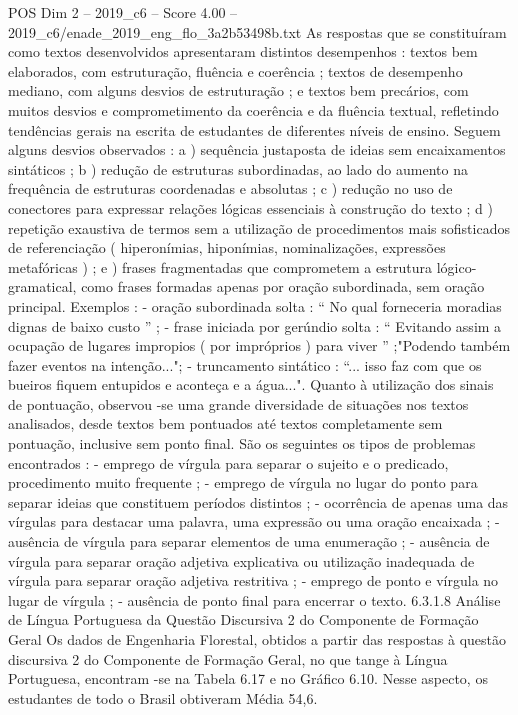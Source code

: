 \begin{textsample}{POS Dim 2 – 2019\_c6 – Score 4.00 – 2019\_c6/enade\_2019\_eng\_flo\_3a2b53498b.txt}
As respostas que se constituíram como textos desenvolvidos apresentaram distintos desempenhos : textos bem elaborados, com estruturação, fluência e coerência ; textos de desempenho mediano, com alguns desvios de estruturação ; e textos bem precários, com muitos desvios e comprometimento da coerência e da fluência textual, refletindo tendências gerais na escrita de estudantes de diferentes níveis de ensino.
Seguem alguns desvios observados : a ) sequência justaposta de ideias sem encaixamentos sintáticos ; b ) redução de estruturas subordinadas, ao lado do aumento na frequência de estruturas coordenadas e absolutas ; c ) redução no uso de conectores para expressar relações lógicas essenciais à construção do texto ; d ) repetição exaustiva de termos sem a utilização de procedimentos mais sofisticados de referenciação ( hiperonímias, hiponímias, nominalizações, expressões metafóricas ) ; e ) frases fragmentadas que comprometem a estrutura lógico-gramatical, como frases formadas apenas por oração subordinada, sem oração principal.
Exemplos : - oração subordinada solta : “ No qual forneceria moradias dignas de baixo custo ” ; - frase iniciada por gerúndio solta : “ Evitando assim a ocupação de lugares impropios ( por impróprios ) para viver ” ;"Podendo também fazer eventos na intenção..."; - truncamento sintático : “... isso faz com que os bueiros fiquem entupidos e aconteça e a água...".
Quanto à utilização dos sinais de pontuação, observou -se uma grande diversidade de situações nos textos analisados, desde textos bem pontuados até textos completamente sem pontuação, inclusive sem ponto final.
São os seguintes os tipos de problemas encontrados : - emprego de vírgula para separar o sujeito e o predicado, procedimento muito frequente ; - emprego de vírgula no lugar do ponto para separar ideias que constituem períodos distintos ; - ocorrência de apenas uma das vírgulas para destacar uma palavra, uma expressão ou uma oração encaixada ; - ausência de vírgula para separar elementos de uma enumeração ; - ausência de vírgula para separar oração adjetiva explicativa ou utilização inadequada de vírgula para separar oração adjetiva restritiva ; - emprego de ponto e vírgula no lugar de vírgula ; - ausência de ponto final para encerrar o texto. 6.3.1.8 Análise de Língua Portuguesa da Questão Discursiva 2 do Componente de Formação Geral Os dados de Engenharia Florestal, obtidos a partir das respostas à questão discursiva 2 do Componente de Formação Geral, no que tange à Língua Portuguesa, encontram -se na Tabela 6.17 e no Gráfico 6.10.
Nesse aspecto, os estudantes de todo o Brasil obtiveram Média 54,6.

\end{textsample}
